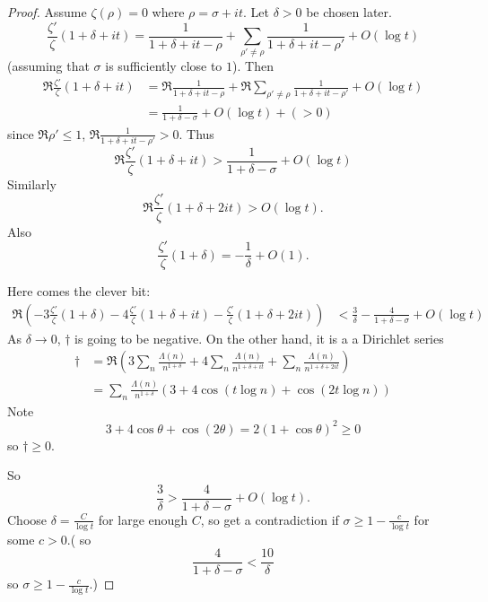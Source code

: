 \documentclass[a4paper]{article}
\theoremstyle{definition}
\begin{document}
\begin{proof}
  Assume \(\zeta(\rho) = 0\) where \(\rho = \sigma + it\). Let \(\delta > 0\) be chosen later.
  \[
    \frac{\zeta'}{\zeta} (1 + \delta + i t)
    = \frac{1}{1 + \delta + it - \rho} + \sum_{\rho' \neq \rho} \frac{1}{1 + \delta + it - \rho'} + O(\log t)
  \]
  (assuming that \(\sigma\) is sufficiently close to \(1\)). Then
  \begin{align*}
    \Re \frac{\zeta'}{\zeta} (1 + \delta + i t)
    &= \Re \frac{1}{1 + \delta + it - \rho} + \Re \sum_{\rho' \neq \rho} \frac{1}{1 + \delta + it - \rho'} + O(\log t) \\
    &= \frac{1}{1 + \delta - \sigma} + O(\log t) + (> 0)
  \end{align*}
  since \(\Re \rho' \leq 1\), \(\Re \frac{1}{1 + \delta + it - \rho'} > 0\). Thus
  \[
    \Re \frac{\zeta'}{\zeta} (1 + \delta + i t)
    > \frac{1}{1 + \delta - \sigma} + O(\log t)
  \]
  Similarly
  \[
    \Re \frac{\zeta'}{\zeta} (1 + \delta + 2 it) > O(\log t).
  \]
  Also
  \[
    \frac{\zeta'}{\zeta} (1 + \delta) = - \frac{1}{\delta} + O(1).
  \]

  Here comes the clever bit:
  \begin{align*}
    \Re(-3 \frac{\zeta'}{\zeta} (1 + \delta) - 4 \frac{\zeta'}{\zeta} (1 + \delta + it) - \frac{\zeta'}{\zeta} (1 + \delta + 2it))
    &< \frac{3}{\delta} - \frac{4}{1 + \delta - \sigma} + O(\log t)
      \tag{\dagger}
  \end{align*}
  As \(\delta \to 0\), \(\dagger\) is going to be negative. On the other hand, it is a a Dirichlet series
  \begin{align*}
    \dagger
    &= \Re( 3 \sum_n \frac{\Lambda(n)}{n^{1 + \delta}} + 4 \sum_n \frac{\Lambda(n)}{n^{1 + \delta + it}} + \sum_n \frac{\Lambda(n)}{n^{1 + \delta + 2it}} ) \\
    &= \sum_n \frac{\Lambda(n)}{n^{1 + \delta}} (3 + 4 \cos (t \log n) + \cos (2t \log n))
  \end{align*}
  Note
  \[
    3 + 4 \cos \theta + \cos (2\theta) = 2 (1 + \cos \theta)^2 \geq 0
  \]
  so \(\dagger \geq 0\).

  So
  \[
    \frac{3}{\delta} > \frac{4}{1 + \delta - \sigma} + O(\log t).
  \]
  Choose \(\delta = \frac{C}{\log t}\) for large enough \(C\), so get a contradiction if \(\sigma \geq 1 - \frac{c}{\log t}\) for some \(c > 0\).( so
  \[
    \frac{4}{1 + \delta - \sigma} < \frac{10}{\delta}
  \]
  so \(\sigma \geq 1 - \frac{c}{\log t}\).)
\end{proof}
\end{document}
